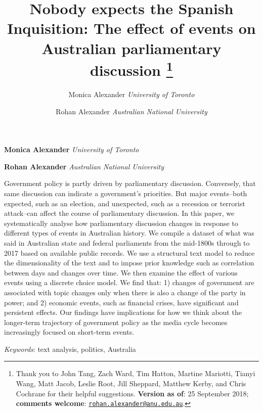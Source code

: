 \documentclass[12pt,]{article}
\title{Nobody expects the Spanish Inquisition: The effect of events on
Australian parliamentary discussion \thanks{Thank you to John Tang, Zach Ward, Tim Hatton, Martine Mariotti, Tianyi
Wang, Matt Jacob, Leslie Root, Jill Sheppard, Matthew Kerby, and Chris
Cochrane for their helpful suggestions. \textbf{Version as of}: 25
September 2018; \textbf{comments welcome}:
\href{mailto:rohan.alexander@anu.edu.au}{\nolinkurl{rohan.alexander@anu.edu.au}}.}  }
\author{\Large Monica Alexander\vspace{0.05in} \newline\normalsize\emph{University of Toronto}   \and \Large Rohan Alexander\vspace{0.05in} \newline\normalsize\emph{Australian National University}  }
\date{}
\newcommand*{\authorfont}{\fontfamily{phv}\selectfont}
\renewenvironment{abstract}
 {{%
    \setlength{\leftmargin}{0mm}
    \setlength{\rightmargin}{\leftmargin}%
  }%
  \relax}
 {\endlist}
\theoremstyle{definition}
\theoremstyle{definition}
\theoremstyle{definition}
\theoremstyle{remark}
\begin{document}
	
%

{%
\setlength{\parindent}{0pt}
\thispagestyle{plain}
{\fontsize{18}{20}\selectfont\raggedright 
\maketitle  %

}

{
   \vskip 13.5pt\relax \normalsize\fontsize{11}{12} 
\textbf{\authorfont Monica Alexander} \hskip 15pt \emph{\small University of Toronto}   \par \textbf{\authorfont Rohan Alexander} \hskip 15pt \emph{\small Australian National University}   

}

}








\begin{abstract}

    \hbox{\vrule height .2pt width 39.14pc}

    \vskip 8.5pt %

\noindent Government policy is partly driven by parliamentary discussion.
Conversely, that same discussion can indicate a government's priorities.
But major events--both expected, such as an election, and unexpected,
such as a recession or terrorist attack--can affect the course of
parliamentary discussion. In this paper, we systematically analyse how
parliamentary discussion changes in response to different types of
events in Australian history. We compile a dataset of what was said in
Australian state and federal parliaments from the mid-1800s through to
2017 based on available public records. We use a structural text model
to reduce the dimensionality of the text and to impose prior knowledge
such as correlation between days and changes over time. We then examine
the effect of various events using a discrete choice model. We find
that: 1) changes of government are associated with topic changes only
when there is also a change of the party in power; and 2) economic
events, such as financial crises, have significant and persistent
effects. Our findings have implications for how we think about the
longer-term trajectory of government policy as the media cycle becomes
increasingly focused on short-term events.


\vskip 8.5pt \noindent \emph{Keywords}: text analysis, politics, Australia \par

    \hbox{\vrule height .2pt width 39.14pc}



\end{abstract}
\end{document}
